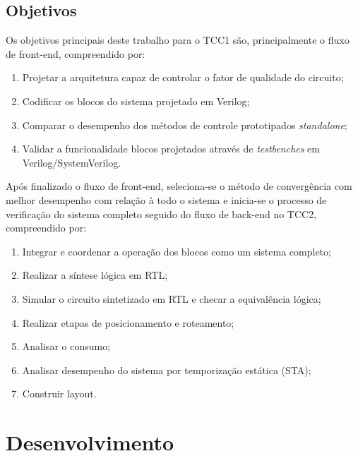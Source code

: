 


\chapter{Objetivos}\label{ch-obj}

Os objetivos principais deste trabalho para o TCC1 são, principalmente o fluxo de front-end, compreendido por:

\begin{enumerate}
    \item Projetar a arquitetura capaz de controlar o fator de qualidade do circuito;
    \item Codificar os blocos do sistema projetado em Verilog;
    \item Comparar o desempenho dos métodos de controle prototipados \textit{standalone};
    \item Validar a funcionalidade blocos projetados através de \textit{testbenches} em Verilog/SystemVerilog.
\end{enumerate}


Após finalizado o fluxo de front-end, seleciona-se o método de convergência com melhor desempenho com relação à todo o sistema e inicia-se o processo de verificação do sistema completo seguido do fluxo de back-end no TCC2, compreendido por:

\begin{enumerate}
    \item Integrar e coordenar a operação dos blocos como um sistema completo;
    \item Realizar a síntese lógica em RTL;
    \item Simular o circuito sintetizado em RTL e checar a equivalência lógica;
    \item Realizar etapas de posicionamento e roteamento;
    \item Analisar o consumo;
    \item Analisar desempenho do sistema por temporização estática (STA);
    \item Construir layout.
\end{enumerate}


\part{Desenvolvimento}


